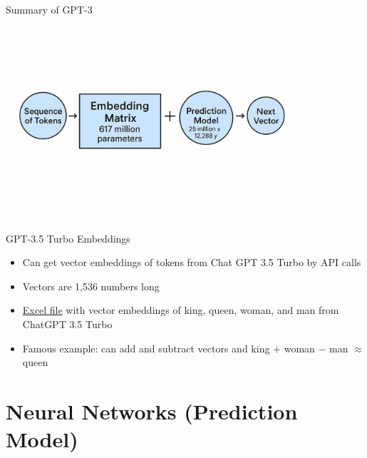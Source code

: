 \documentclass[10pt]{beamer}
\begin{document}
\begin{frame}{Summary of GPT-3}
    \begin{center}
    \includegraphics[width=0.8\textwidth]{../images/gpt5.png}
    \end{center}
\end{frame}

\begin{frame}{GPT-3.5 Turbo Embeddings}
    \begin{itemize}
        \item Can get vector embeddings of tokens from Chat GPT 3.5 Turbo by API calls 
        \item Vectors are 1,536 numbers long
        \item \href{https://mgmt675-2025/assets/embeddings.xlsx}{Excel file} with vector embeddings of king, queen, woman, and man from ChatGPT 3.5 Turbo
        \item Famous example: can add and subtract vectors and king $+$ woman $-$ man $\approx$ queen
    \end{itemize}
\end{frame}

\section{Neural Networks (Prediction Model)}
\end{document}
